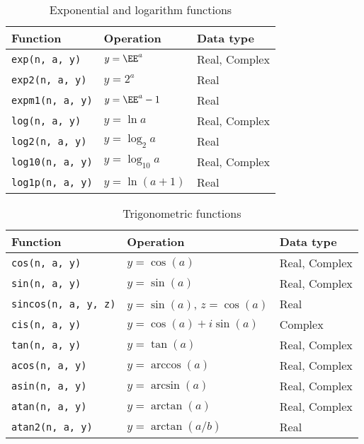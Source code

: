 \begin{table}
  \begin{tabularx}{\textwidth}{LLL}
    \toprule
    Function & Operation & Data type \\
    \midrule
    \texttt{exp(n, a, y)}   & $y = \EE^a$       & Real, Complex \\
    \texttt{exp2(n, a, y)}  & $y = 2^a$         & Real          \\
    \texttt{expm1(n, a, y)} & $y = \EE^a - 1$   & Real          \\
    \texttt{log(n, a, y)}   & $y = \ln a$       & Real, Complex \\
    \texttt{log2(n, a, y)}  & $y = \log_2 a$    & Real          \\
    \texttt{log10(n, a, y)} & $y = \log_{10} a$ & Real, Complex \\
    \texttt{log1p(n, a, y)} & $y = \ln(a + 1)$  & Real          \\
    \bottomrule
  \end{tabularx}
  \caption{Exponential and logarithm functions}
  \label{tab:Exponential and logarithm functions}
\end{table}

\begin{table}
  \begin{tabularx}{\textwidth}{LLL}
    \toprule
    Function & Operation & Data type \\
    \midrule
    \texttt{cos(n, a, y)}       & $y = \cos(a)$        & Real, Complex \\
    \texttt{sin(n, a, y)}       & $y = \sin(a)$        & Real, Complex \\
    \texttt{sincos(n, a, y, z)} & $y = \sin(a)$, $z = \cos(a)$ & Real  \\
    \texttt{cis(n, a, y)}       & $y = \cos(a) + i\sin(a)$   & Complex \\
    \texttt{tan(n, a, y)}       & $y = \tan(a)$        & Real, Complex \\
    \texttt{acos(n, a, y)}      & $y = \arccos(a)$     & Real, Complex \\
    \texttt{asin(n, a, y)}      & $y = \arcsin(a)$     & Real, Complex \\
    \texttt{atan(n, a, y)}      & $y = \arctan(a)$     & Real, Complex \\
    \texttt{atan2(n, a, y)}     & $y = \arctan(a / b)$ & Real          \\
    \bottomrule
  \end{tabularx}
  \caption{Trigonometric functions}
  \label{tab:Trigonometric functions}
\end{table}

